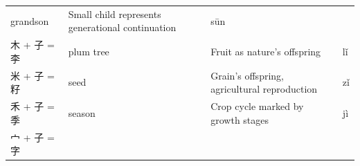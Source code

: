 \begin{longtable}[]{@{}llll@{}}
\begin{minipage}[t]{0.15\columnwidth}
grandson\strut
\end{minipage} & \begin{minipage}[t]{0.43\columnwidth}\raggedright
Small child represents generational continuation\strut
\end{minipage} & \begin{minipage}[t]{0.15\columnwidth}\raggedright
sūn\strut
\end{minipage}\tabularnewline
\begin{minipage}[t]{0.15\columnwidth}\raggedright
木 + 子 = 李\strut
\end{minipage} & \begin{minipage}[t]{0.15\columnwidth}\raggedright
plum tree\strut
\end{minipage} & \begin{minipage}[t]{0.43\columnwidth}\raggedright
Fruit as nature's offspring\strut
\end{minipage} & \begin{minipage}[t]{0.15\columnwidth}\raggedright
lǐ\strut
\end{minipage}\tabularnewline
\begin{minipage}[t]{0.15\columnwidth}\raggedright
米 + 子 = 籽\strut
\end{minipage} & \begin{minipage}[t]{0.15\columnwidth}\raggedright
seed\strut
\end{minipage} & \begin{minipage}[t]{0.43\columnwidth}\raggedright
Grain's offspring, agricultural reproduction\strut
\end{minipage} & \begin{minipage}[t]{0.15\columnwidth}\raggedright
zǐ\strut
\end{minipage}\tabularnewline
\begin{minipage}[t]{0.15\columnwidth}\raggedright
禾 + 子 = 季\strut
\end{minipage} & \begin{minipage}[t]{0.15\columnwidth}\raggedright
season\strut
\end{minipage} & \begin{minipage}[t]{0.43\columnwidth}\raggedright
Crop cycle marked by growth stages\strut
\end{minipage} & \begin{minipage}[t]{0.15\columnwidth}\raggedright
jì\strut
\end{minipage}\tabularnewline
\begin{minipage}[t]{0.15\columnwidth}\raggedright
宀 + 子 = 字\strut

\end{minipage}
\end{longtable}
